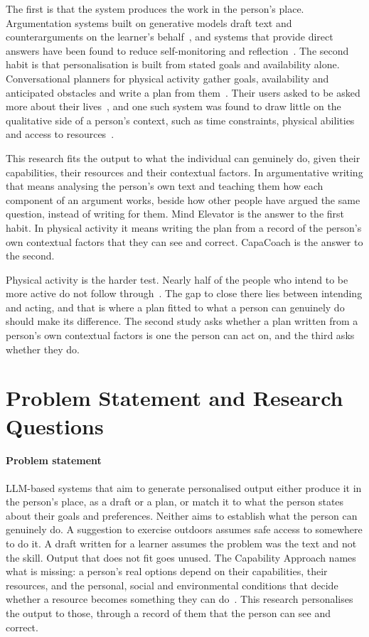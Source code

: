 \documentclass[manuscript,screen,review]{acmart}
\begin{document}
The first is that the system produces the work in the person's place. Argumentation systems built on generative models draft text and counterarguments on the learner's behalf~\cite{zhang2023visar,su2023collaborating}, and systems that provide direct answers have been found to reduce self-monitoring and reflection~\cite{oecd2026outlook}. The second habit is that personalisation is built from stated goals and availability alone. Conversational planners for physical activity gather goals, availability and anticipated obstacles and write a plan from them~\cite{shin2025planfitting,jorke2025gptcoach}. Their users asked to be asked more about their lives~\cite{shin2025planfitting,xu2025goals}, and one such system was found to draw little on the qualitative side of a person's context, such as time constraints, physical abilities and access to resources~\cite{jorke2025gptcoach}.

This research fits the output to what the individual can genuinely do, given their capabilities, their resources and their contextual factors. In argumentative writing that means analysing the person's own text and teaching them how each component of an argument works, beside how other people have argued the same question, instead of writing for them. Mind Elevator is the answer to the first habit. In physical activity it means writing the plan from a record of the person's own contextual factors that they can see and correct. CapaCoach is the answer to the second.

Physical activity is the harder test. Nearly half of the people who intend to be more active do not follow through~\cite{rhodes2013big}. The gap to close there lies between intending and acting, and that is where a plan fitted to what a person can genuinely do should make its difference. The second study asks whether a plan written from a person's own contextual factors is one the person can act on, and the third asks whether they do.

\section{Problem Statement and Research Questions}

\paragraph{Problem statement} LLM-based systems that aim to generate personalised output either produce it in the person's place, as a draft or a plan, or match it to what the person states about their goals and preferences. Neither aims to establish what the person can genuinely do. A suggestion to exercise outdoors assumes safe access to somewhere to do it. A draft written for a learner assumes the problem was the text and not the skill. Output that does not fit goes unused. The Capability Approach names what is missing: a person's real options depend on their capabilities, their resources, and the personal, social and environmental conditions that decide whether a resource becomes something they can do~\cite{sen1999development,robeyns2005capability}. This research personalises the output to those, through a record of them that the person can see and correct.
\end{document}
